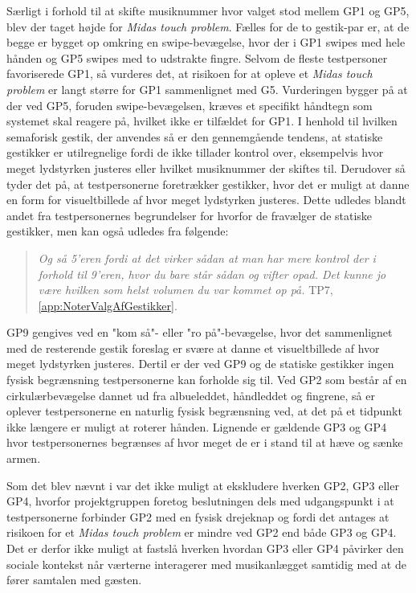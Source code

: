 Særligt i forhold til at skifte musiknummer hvor valget stod mellem GP1 og GP5, blev der taget højde for \textit{Midas touch problem}. Fælles for de to gestik-par er, at de begge er bygget op omkring en swipe-bevægelse, hvor der i GP1 swipes med hele hånden og GP5 swipes med to udstrakte fingre. Selvom de fleste testpersoner favoriserede GP1, så vurderes det, at risikoen for at opleve et \textit{Midas touch problem} er langt større for GP1 sammenlignet med G5. Vurderingen bygger på at der ved GP5, foruden swipe-bevægelsen, kræves et specifikt håndtegn som systemet skal reagere på, hvilket ikke er tilfældet for GP1.\blankline
%
I henhold til hvilken semaforisk gestik, der anvendes så er den gennemgående tendens, at statiske gestikker er utilregnelige fordi de ikke tillader kontrol over, eksempelvis hvor meget lydstyrken justeres eller hvilket musiknummer der skiftes til. Derudover så tyder det på, at testpersonerne foretrækker gestikker, hvor det er muligt at danne en form for visueltbillede af hvor meget lydstyrken justeres. Dette udledes blandt andet fra testpersonernes begrundelser for hvorfor de fravælger de statiske gestikker, men kan også udledes fra følgende:  
%
\begin{quotation}
	\noindent
	\textit{Og så 5'eren fordi at det virker sådan at man har mere kontrol der i forhold til 9'eren, hvor du bare står sådan og vifter opad. Det kunne jo være hvilken som helst volumen du var kommet op på.} TP7, \autoref{app:NoterValgAfGestikker}.
\noindent
\end{quotation}
%
GP9 gengives ved en "kom så"- eller "ro på"-bevægelse, hvor det sammenlignet med de resterende gestik foreslag er svære at danne et visueltbillede af hvor meget lydstyrken justeres. Dertil er der ved GP9 og de statiske gestikker ingen fysisk begrænsning testpersonerne kan forholde sig til. Ved GP2 som består af en cirkulærbevægelse dannet ud fra albueleddet, håndleddet og fingrene, så er oplever testpersonerne en naturlig fysisk begrænsning ved, at det på et tidpunkt ikke længere er muligt at roterer hånden. Lignende er gældende GP3 og GP4 hvor testpersonernes begrænses af hvor meget de er i stand til at hæve og sænke armen.

Som det blev nævnt i  var det ikke muligt at ekskludere hverken GP2, GP3 eller GP4, hvorfor projektgruppen foretog beslutningen dels med udgangspunkt i at testpersonerne forbinder GP2 med en fysisk drejeknap og fordi det antages at risikoen for et \textit{Midas touch problem} er mindre ved GP2 end både GP3 og GP4. Det er derfor ikke muligt at fastslå hverken hvordan GP3 eller GP4 påvirker den sociale kontekst når værterne interagerer med musikanlægget samtidig med at de fører samtalen med gæsten.  
 





